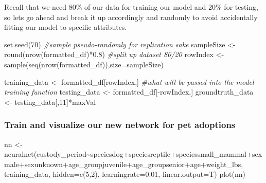 \documentclass[
]{article}
\newenvironment{Shaded}{\begin{snugshade}}{\end{snugshade}}
\newcommand{\AttributeTok}[1]{\textcolor[rgb]{0.77,0.63,0.00}{#1}}
\newcommand{\CommentTok}[1]{\textcolor[rgb]{0.56,0.35,0.01}{\textit{#1}}}
\newcommand{\DecValTok}[1]{\textcolor[rgb]{0.00,0.00,0.81}{#1}}
\newcommand{\FloatTok}[1]{\textcolor[rgb]{0.00,0.00,0.81}{#1}}
\newcommand{\FunctionTok}[1]{\textcolor[rgb]{0.00,0.00,0.00}{#1}}
\newcommand{\NormalTok}[1]{#1}
\newcommand{\OtherTok}[1]{\textcolor[rgb]{0.56,0.35,0.01}{#1}}
\newcommand{\SpecialCharTok}[1]{\textcolor[rgb]{0.00,0.00,0.00}{#1}}
\begin{document}
Recall that we need 80\% of our data for training our model and 20\% for
testing, so lets go ahead and break it up accordingly and randomly to
avoid accidentally fitting our model to specific attributes.

\begin{Shaded}
\begin{Highlighting}[]
\FunctionTok{set.seed}\NormalTok{(}\DecValTok{70}\NormalTok{) }\CommentTok{\#sample pseudo{-}randomly for replication sake}
\NormalTok{sampleSize }\OtherTok{\textless{}{-}} \FunctionTok{round}\NormalTok{(}\FunctionTok{nrow}\NormalTok{(formatted\_df)}\SpecialCharTok{*}\FloatTok{0.8}\NormalTok{) }\CommentTok{\#split up dataset 80/20}
\NormalTok{rowIndex }\OtherTok{\textless{}{-}} \FunctionTok{sample}\NormalTok{(}\FunctionTok{seq}\NormalTok{(}\FunctionTok{nrow}\NormalTok{(formatted\_df)),}\AttributeTok{size=}\NormalTok{sampleSize)}

\NormalTok{training\_data }\OtherTok{\textless{}{-}}\NormalTok{ formatted\_df[rowIndex,] }\CommentTok{\#what will be passed into the model training function}
\NormalTok{testing\_data }\OtherTok{\textless{}{-}}\NormalTok{  formatted\_df[}\SpecialCharTok{{-}}\NormalTok{rowIndex,]}
\NormalTok{groundtruth\_data }\OtherTok{\textless{}{-}}\NormalTok{ testing\_data[,}\DecValTok{11}\NormalTok{]}\SpecialCharTok{*}\NormalTok{maxVal}
\end{Highlighting}
\end{Shaded}

\hypertarget{train-and-visualize-our-new-network-for-pet-adoptions}{%
\subsubsection{Train and visualize our new network for pet
adoptions}\label{train-and-visualize-our-new-network-for-pet-adoptions}}

\begin{Shaded}
\begin{Highlighting}[]
\NormalTok{nn }\OtherTok{\textless{}{-}} \FunctionTok{neuralnet}\NormalTok{(custody\_period}\SpecialCharTok{\textasciitilde{}}\NormalTok{speciesdog}\SpecialCharTok{+}\NormalTok{speciesreptile}\SpecialCharTok{+}\NormalTok{speciessmall\_mammal}\SpecialCharTok{+}\NormalTok{sexmale}\SpecialCharTok{+}\NormalTok{sexunknown}\SpecialCharTok{+}\NormalTok{age\_groupjuvenile}\SpecialCharTok{+}\NormalTok{age\_groupsenior}\SpecialCharTok{+}\NormalTok{age}\SpecialCharTok{+}\NormalTok{weight\_lbs,}
\NormalTok{                training\_data,}
                \AttributeTok{hidden=}\FunctionTok{c}\NormalTok{(}\DecValTok{5}\NormalTok{,}\DecValTok{2}\NormalTok{), }\AttributeTok{learningrate=}\FloatTok{0.01}\NormalTok{,  }
                \AttributeTok{linear.output=}\NormalTok{T)}
\FunctionTok{plot}\NormalTok{(nn)}
\end{Highlighting}
\end{Shaded}
\end{document}

